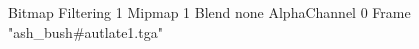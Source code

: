 {Bitmap
	{Filtering 1}
	{Mipmap 1}
	{Blend none}
	{AlphaChannel 0}
	{Frame "ash_bush#autlate1.tga"}
}

